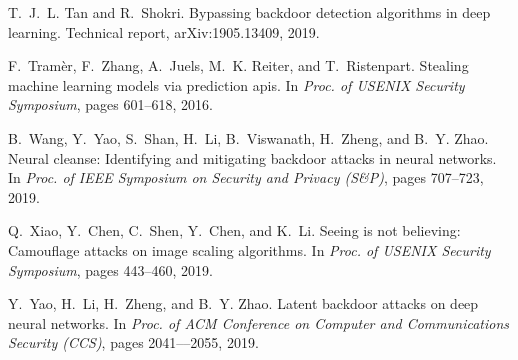 \documentclass[conference]{IEEEtran}
\begin{document}
{\begin{thebibliography}{21}
	T.~J.~L. Tan and R.~Shokri.
	\newblock Bypassing backdoor detection algorithms in deep learning.
	\newblock Technical report, arXiv:1905.13409, 2019.
	
	F.~Tram{\`e}r, F.~Zhang, A.~Juels, M.~K. Reiter, and T.~Ristenpart.
	\newblock Stealing machine learning models via prediction apis.
	\newblock In \emph{Proc. of {USENIX} Security Symposium}, pages 
	601--618, 2016.
	
	B.~Wang, Y.~Yao, S.~Shan, H.~Li, B.~Viswanath, H.~Zheng, and B.~Y. 
	Zhao.
	\newblock Neural cleanse: Identifying and mitigating backdoor 
	attacks in neural
	networks.
	\newblock In \emph{Proc. of {IEEE} Symposium on Security and 
	Privacy ({S\&P})},
	pages 707--723, 2019.
	
	Q.~Xiao, Y.~Chen, C.~Shen, Y.~Chen, and K.~Li.
	\newblock Seeing is not believing: Camouflage attacks on image 
	scaling
	algorithms.
	\newblock In \emph{Proc. of {USENIX} Security Symposium}, pages 
	443--460, 2019.
	
	Y.~Yao, H.~Li, H.~Zheng, and B.~Y. Zhao.
	\newblock Latent backdoor attacks on deep neural networks.
	\newblock In \emph{Proc. of {ACM} Conference on Computer and 
	Communications
		Security ({CCS})}, pages 2041–--2055, 2019.
	
\end{thebibliography}

}
\end{document}
